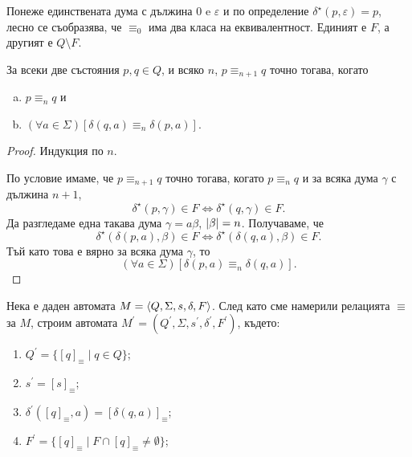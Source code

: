 Понеже единствената дума с дължина $0$ e $\varepsilon$ и по определение $\delta^\star(p,\varepsilon) = p$, 
лесно се съобразява, че $\equiv_0$ има два класа на еквивалентност.
Единият е $F$, а другият е $Q\setminus F$.

\begin{prop}
  За всеки две състояния $p,q \in Q$, и всяко $n$, $p \equiv_{n+1} q$ точно тогава, когато
  \begin{enumerate}[a)]
  \item
    $p \equiv_{n} q$ и
  \item
    $(\forall a \in \Sigma)[\delta(q,a) \equiv_{n} \delta(p,a)]$.
  \end{enumerate}
\end{prop}
\begin{proof}%
  Индукция по $n$.
  
  По условие имаме, че $p\equiv_{n+1} q$ точно тогава, когато
  $p\equiv_n q$ и за всяка дума $\gamma$ с дължина $n+1$,
  \[\delta^\star(p,\gamma) \in F \iff \delta^\star(q,\gamma)\in F.\]
  Да разгледаме една такава дума $\gamma = a\beta$, $\lvert{\beta}\rvert = n$.
  Получаваме, че 
  \[\delta^\star(\delta(p,a),\beta) \in F \iff \delta^\star(\delta(q,a),\beta) \in F.\]
  Тъй като това е вярно за всяка дума $\gamma$, то
  \[(\forall a\in\Sigma)[\delta(p,a) \equiv_{n} \delta(q, a)].\]
  
\end{proof}

Нека е даден автомата $M = \langle{Q,\Sigma,s,\delta,F}\rangle$.
След като сме намерили релацията $\equiv$ за $M$, 
строим автомата $M^\prime = (Q^\prime,\Sigma,s^\prime,\delta^\prime,F^\prime)$, където:
\begin{enumerate}[1)]
\item
  $Q^\prime = \{[q]_\equiv \mid q\in Q\}$;
\item
  $s^\prime = [s]_\equiv$;
\item
  $\delta^\prime([q]_\equiv, a) = [\delta(q,a)]_\equiv$;
\item
  $F^\prime = \{[q]_\equiv\mid F\cap [q]_\equiv \neq \emptyset\}$;
\end{enumerate}


      

